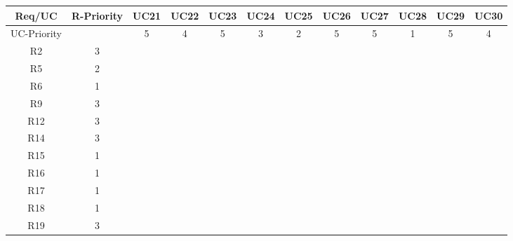 \documentclass{article}
\begin{document}
\begin{longtable}{|c|c|c|c|c|c|c|c|c|c|c|c|}
	Req/UC      & R-Priority & UC21      & UC22      & UC23      & UC24      & UC25      & UC26      & UC27      & UC28      & UC29      & UC30      \\
	\hline
	UC-Priority &            & 5         & 4         & 5         & 3         & 2         & 5         & 5         & 1         & 5         & 4         \\
	\hline
	R2          & 3          &           &           &           &           &           &           &           &           &           &           \\
	\hline
	R5          & 2          &           &           &           &           &           &           &           &           &           &           \\
	\hline
	R6          & 1          &           &           &           &           &           &           &           &           &           &           \\
	\hline
	R9          & 3          &           &           &           &           &           &           &           &           &           &           \\
	\hline
	R12         & 3          &           &           &           &           &           &           &           &           &           &           \\
	\hline
	R14         & 3          &           &           &           &           &           &           &           &           &           &           \\
	\hline
	R15         & 1          &           &           &           &           &           &           &           &           &           &           \\
	\hline
	R16         & 1          &           &           &           &           &           &           &           &           &           &           \\
	\hline
	R17         & 1          &           &           &           &           &           &           &           &           &           &           \\
	\hline
	R18         & 1          &           &           &           &           &           &           &           &           &           &           \\
	\hline
	R19         & 3          &           &           &           &           &           &           &           &           &           &           \\

\end{longtable}
\end{document}
